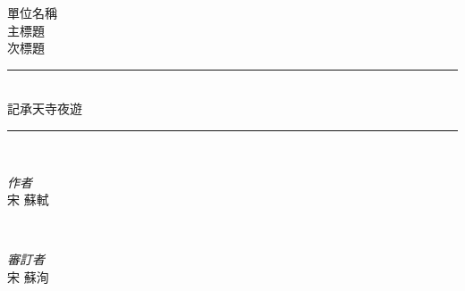 \begin{titlepage} %
  \newcommand{\HRule}{\rule{\linewidth}{0.5mm}} %

  \center %


  \textsf{\LARGE 單位名稱}\\[1.5cm] %

  \textsf{\Large 主標題}\\[0.5cm] %

  \textsf{\large 次標題}\\[0.5cm] %


  \HRule\\[0.4cm]

  {\huge\iyan 記承天寺夜遊}\\[0.4cm] %

  \HRule\\[1.5cm]


  \begin{minipage}{0.4\textwidth}
    \begin{flushleft}
      \large
      \textit{作者}\\
      \textsf{宋 蘇軾} %
    \end{flushleft}
  \end{minipage}
  ~
  \begin{minipage}{0.4\textwidth}
    \begin{flushright}
      \large
      \textit{審訂者}\\
      \textsf{宋 蘇洵} %
    \end{flushright}
  \end{minipage}



\end{titlepage}
